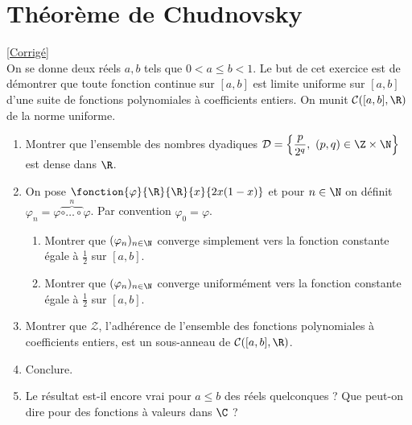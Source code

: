 \documentclass{book}
\begin{document}
	\section{Théorème de Chudnovsky }
	\textcolor{blue}{\hyperref[sec:theoreme-de-chudnovsky-etoile4]{[Corrigé]}}\\
	\label{Théorème de Chudnovsky}
	On se donne deux réels $a,b$ tels que $0<a\leq b<1$. Le but de cet exercice est de démontrer que toute fonction continue sur $[a,b]$ est limite uniforme sur $[a,b]$ d'une suite de fonctions polynomiales à coefficients entiers. On munit $\mathcal C([a,b],\R)$ de la norme uniforme.
	\begin{enumerate}
		\item Montrer que l'ensemble des nombres dyadiques $\mathcal D=\left\{\displaystyle\frac{p}{2^q},\ (p,q)\in \Z\times\N\right\}$ est dense dans $\R$.
		\item On pose $\fonction{\varphi}{\R}{\R}{x}{2x(1-x)}$ et pour $n\in \N$ on définit $\varphi_n=\varphi\overset{n}{\overbrace{\circ\dots\circ}}\varphi$. Par convention $\varphi_0=\varphi$.
		\begin{enumerate}[label=\alph*.]
			\item Montrer que $(\varphi_n)_{n\in \N}$ converge simplement vers la fonction constante égale à $\displaystyle\frac{1}{2}$ sur $[a,b]$.
			\item Montrer que $(\varphi_n)_{n\in \N}$ converge uniformément vers la fonction constante égale à $\displaystyle\frac{1}{2}$ sur $[a,b]$.
		\end{enumerate}
		\item Montrer que $\mathcal Z$, l'adhérence de l'ensemble des fonctions polynomiales à coefficients entiers, est un sous-anneau de $\mathcal C([a,b],\R)$.
		\item Conclure.
		\item Le résultat est-il encore vrai pour $a\leq b$ des réels quelconques ? Que peut-on dire pour des fonctions à valeurs dans $\C$ ?
	\end{enumerate}
	
\end{document}
